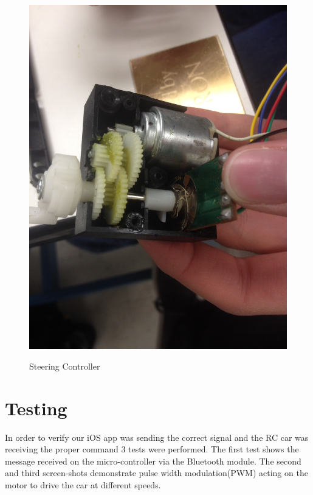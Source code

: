 \documentclass[12pt]{article}
\begin{document}
\begin{figure}[H]
\begin {center}
\includegraphics[scale=.10]{encoder}\\
\caption{Steering Controller}
\label{fig:steering}
\end {center}
\end{figure}


\section{Testing}
In order to verify our iOS app was sending the correct signal and the RC car was receiving the proper command 3 tests were performed. The first test shows the message received on the micro-controller via the Bluetooth module. The second and third screen-shots demonstrate pulse width modulation(PWM) acting on the motor to drive the car at different speeds.\\
\end{document}
